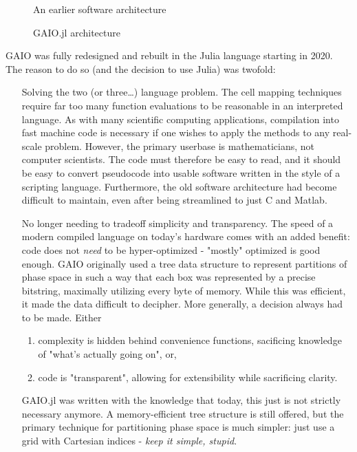 \documentclass{juliacon}
\begin{document}
\begin{figure}
    \centering
    \resizebox{0.45\textwidth}{!}{
        
    }
    \caption{An earlier software architecture}
    \label{fig:old_arch}
\end{figure}

\begin{figure}
    \centering
    
    \caption{GAIO.jl architecture}
    \label{fig:arch}
\end{figure}

GAIO was fully redesigned and rebuilt in the Julia language starting in 2020. The reason to do so (and the decision to use Julia) was twofold:

\begin{enumerate}
    \item[Solving the two (or three\dots) language problem.] The cell mapping techniques require far too many function evaluations to be reasonable in an interpreted language. As with many scientific computing applications, compilation into fast machine code is necessary if one wishes to apply the methods to any real-scale problem. However, the primary userbase is mathematicians, not computer scientists. The code must therefore be easy to read, and it should be easy to convert pseudocode into usable software written in the style of a scripting language. Furthermore, the old software architecture had become difficult to maintain, even after being streamlined to just C and Matlab. 
    
    \item[No longer needing to tradeoff simplicity and transparency.] The speed of a modern compiled language on today's hardware comes with an added benefit: code does not \emph{need} to be hyper-optimized - "mostly" optimized is good enough. GAIO originally used a tree data structure to represent partitions of phase space in such a way that each box was represented by a precise bitstring, maximally utilizing every byte of memory. While this was efficient, it made the data difficult to decipher. More generally, a decision always had to be made. Either
    
    \begin{enumerate}
        \item complexity is hidden behind convenience functions, sacificing knowledge of "what's actually going on", or,
        \item code is "transparent", allowing for extensibility while sacrificing clarity. 
    \end{enumerate}

    GAIO.jl was written with the knowledge that today, this just is not strictly necessary anymore. A memory-efficient tree structure is still offered, but the primary technique for partitioning phase space is much simpler: just use a grid with Cartesian indices - \emph{keep it simple, stupid}. 
\end{enumerate}
\end{document}
